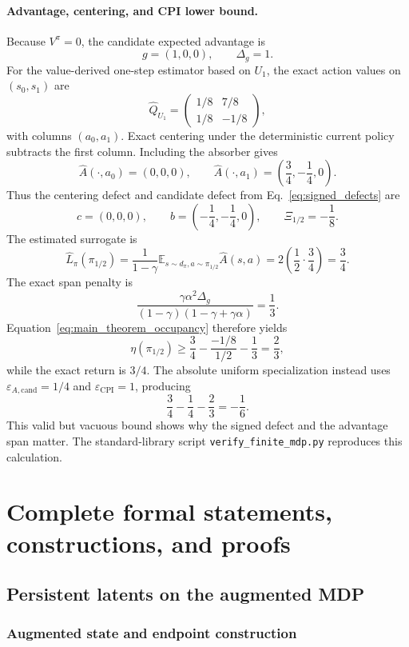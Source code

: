 \documentclass{article}
\theoremstyle{plain}
\theoremstyle{definition}
\theoremstyle{remark}
\newcommand{\E}{\mathbb{E}}
\begin{document}
\paragraph{Advantage, centering, and CPI lower bound.}
Because $V^\pi=0$, the candidate expected advantage is
\[
g=(1,0,0),\qquad \Delta_g=1.
\]
For the value-derived one-step estimator based on $U_1$, the exact action
values on $(s_0,s_1)$ are
\[
\widehat Q_{U_1}
=\begin{pmatrix}1/8&7/8\\1/8&-1/8\end{pmatrix},
\]
with columns $(a_0,a_1)$. Exact centering under the deterministic current policy
subtracts the first column. Including the absorber gives
\[
\widehat A(\cdot,a_0)=(0,0,0),\qquad
\widehat A(\cdot,a_1)=\left(\frac34,-\frac14,0\right).
\]
Thus the centering defect and candidate defect from
Eq.~\eqref{eq:signed_defects} are
\[
c=(0,0,0),\qquad
b=\left(-\frac14,-\frac14,0\right),\qquad
\Xi_{1/2}=-\frac18.
\]
The estimated surrogate is
\[
\widehat L_\pi(\pi_{1/2})
=\frac{1}{1-\gamma}
\E_{s\sim d_\pi,a\sim\pi_{1/2}}\widehat A(s,a)
=2\left(\frac12\cdot\frac34\right)=\frac34.
\]
The exact span penalty is
\[
\frac{\gamma\alpha^2\Delta_g}
{(1-\gamma)(1-\gamma+\gamma\alpha)}
=\frac13.
\]
Equation~\eqref{eq:main_theorem_occupancy} therefore yields
\[
\eta(\pi_{1/2})
\ge \frac34-\frac{-1/8}{1/2}-\frac13
=\frac23,
\]
while the exact return is $3/4$. The absolute uniform specialization
instead uses $\varepsilon_{A,\mathrm{cand}}=1/4$ and
$\varepsilon_{\mathrm{CPI}}=1$, producing
\[
\frac34-\frac14-\frac23=-\frac16.
\]
This valid but vacuous bound shows why the signed defect and the advantage
span matter. The standard-library script \texttt{verify\_finite\_mdp.py}
reproduces this calculation.
\section{Complete formal statements, constructions, and proofs}
\label{app:formal_results}

\subsection{Persistent latents on the augmented MDP}
\label{app:persistent_latent}

\subsubsection{Augmented state and endpoint construction}
\label{sec:persistent_augmented_cpi}
\end{document}
